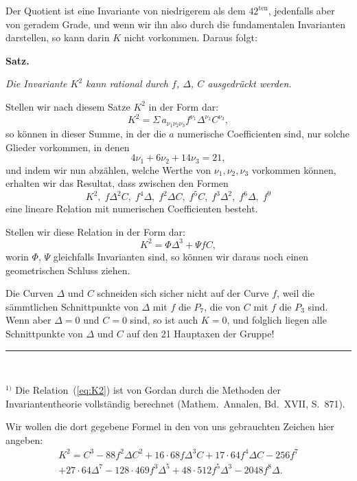 \documentclass[12pt,a4paper]{article}
\begin{document}
Der Quotient ist eine Invariante von niedrigerem als dem $42^{\text{ten}}$, jedenfalls aber von geradem Grade, und wenn wir ihn also durch die fundamentalen Invarianten darstellen, so kann darin $K$ nicht vorkommen. Daraus folgt:

\begin{center}\textbf{Satz.}\end{center}
\textit{Die Invariante $K^2$ kann rational durch $f$, $\Delta$, $C$ ausgedr\"uckt werden.}

Stellen wir nach diesem Satze $K^2$ in der Form dar:
\begin{equation}
\label{eq:K2} K^2 = \Sigma\, a_{\nu_1\nu_2\nu_3} f^{\nu_1} \Delta^{\nu_2} C^{\nu_3},
\end{equation}
so k\"onnen in dieser Summe, in der die $a$ numerische Coefficienten sind, nur solche Glieder vorkommen, in denen
\[4\nu_1 + 6\nu_2 + 14\nu_3 = 21,\]
und indem wir nun abz\"ahlen, welche Werthe von $\nu_1, \nu_2, \nu_3$ vorkommen k\"onnen, erhalten wir das Resultat, dass zwischen den Formen
\[K^2, \; f\Delta^2 C, \; f^4\Delta, \; f^2\Delta C, \; f^5 C, \; f^3\Delta^2, \; f^6\Delta, \; f^9\]
eine lineare Relation mit numerischen Coefficienten besteht.

Stellen wir diese Relation in der Form dar:
\begin{equation}
\label{eq:rel4} K^2 = \Phi\Delta^3 + \Psi fC,
\end{equation}
worin $\Phi$, $\Psi$ gleichfalls Invarianten sind, so k\"onnen wir daraus noch einen geometrischen Schluss ziehen.

Die Curven $\Delta$ und $C$ schneiden sich sicher nicht auf der Curve $f$, weil die s\"ammtlichen Schnittpunkte von $\Delta$ mit $f$ die $P_7$, die von $C$ mit $f$ die $P_3$ sind. Wenn aber $\Delta = 0$ und $C = 0$ sind, so ist auch $K = 0$, und folglich liegen alle Schnittpunkte von $\Delta$ und $C$ auf den 21 Hauptaxen der Gruppe!

\vspace{1em}
\noindent\rule{0.3\textwidth}{0.4pt}\\[0.3em]
{\small
$^{1)}$ Die Relation~(\ref{eq:K2}) ist von Gordan durch die Methoden der Invariantentheorie vollst\"andig berechnet (Mathem.~Annalen, Bd.~XVII, S.~871).

Wir wollen die dort gegebene Formel in den von uns gebrauchten Zeichen hier angeben:
\begin{multline*}
K^2 = C^3 - 88f^2\Delta C^2 + 16 \cdot 68 f\Delta^3 C + 17 \cdot 64 f^4\Delta C - 256f^7\\ + 27 \cdot 64 \Delta^7 - 128 \cdot 469 f^3\Delta^5 + 48 \cdot 512 f^5\Delta^3 - 2048 f^8\Delta.
\end{multline*}
}
\end{document}
